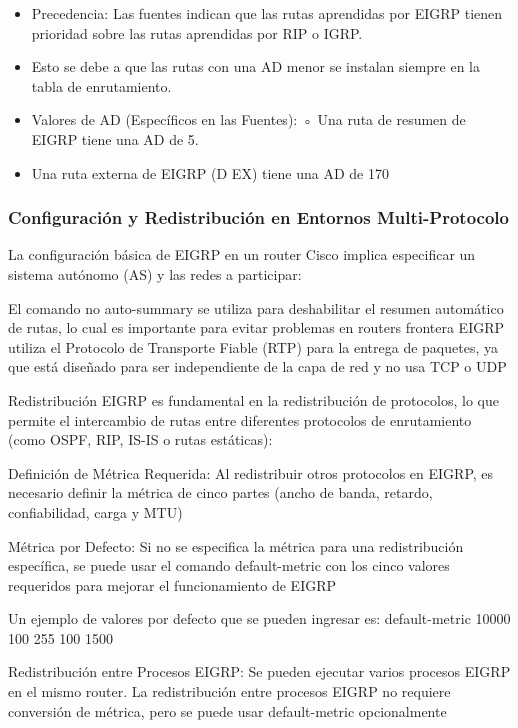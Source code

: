 \documentclass[a5paper]{book}%
\begin{document}
  \begin{itemize}
  	\item Precedencia: Las fuentes indican que las rutas aprendidas por EIGRP tienen prioridad sobre las rutas aprendidas por RIP o IGRP.
  	\item Esto se debe a que las rutas con una AD menor se instalan siempre en la tabla de enrutamiento.
  	\item Valores de AD (Específicos en las Fuentes):
  	◦ Una ruta de resumen de EIGRP tiene una AD de 5.
  	\item Una ruta externa de EIGRP (D EX) tiene una AD de 170
  \end{itemize}
  
  \subsubsection{Configuración y Redistribución en Entornos Multi-Protocolo}
  La configuración básica de EIGRP en un router Cisco implica especificar un sistema autónomo (AS) y las redes a participar:
  
  
  El comando no auto-summary se utiliza para deshabilitar el resumen automático de rutas, lo cual es importante para evitar problemas en routers frontera
  EIGRP utiliza el Protocolo de Transporte Fiable (RTP) para la entrega de paquetes, ya que está diseñado para ser independiente de la capa de red y no usa TCP o UDP
  
  Redistribución
  EIGRP es fundamental en la redistribución de protocolos, lo que permite el intercambio de rutas entre diferentes protocolos de enrutamiento (como OSPF, RIP, IS-IS o rutas estáticas):
  
  Definición de Métrica Requerida: Al redistribuir otros protocolos en EIGRP, es necesario definir la métrica de cinco partes (ancho de banda, retardo, confiabilidad, carga y MTU)
  
  Métrica por Defecto: Si no se especifica la métrica para una redistribución específica, se puede usar el comando default-metric con los cinco valores requeridos para mejorar el funcionamiento de EIGRP
  
  Un ejemplo de valores por defecto que se pueden ingresar es: default-metric 10000 100 255 100 1500
  
  Redistribución entre Procesos EIGRP: Se pueden ejecutar varios procesos EIGRP en el mismo router. La redistribución entre procesos EIGRP no requiere conversión de métrica, pero se puede usar default-metric opcionalmente
  
\end{document}
